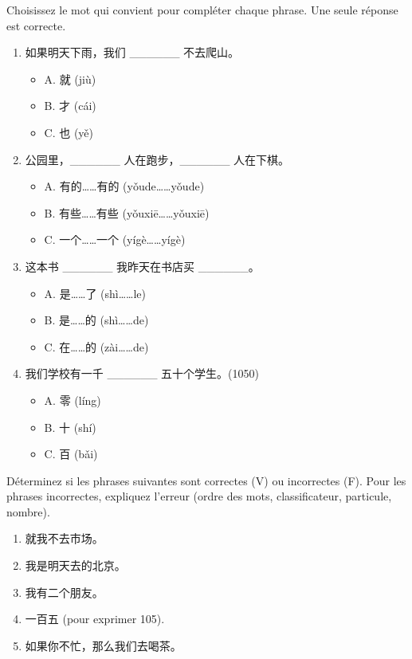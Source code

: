 \documentclass[11pt]{article}
\begin{document}
\begin{exercice}
Choisissez le mot qui convient pour compléter chaque phrase. Une seule réponse est correcte.
\begin{enumerate}
    \item 如果明天下雨，我们 \_\_\_\_\_\_ 不去爬山。
    \begin{itemize}
        \item A. 就 (jiù)
        \item B. 才 (cái)
        \item C. 也 (yě)
    \end{itemize}
    \item 公园里，\_\_\_\_\_\_ 人在跑步，\_\_\_\_\_\_ 人在下棋。
    \begin{itemize}
        \item A. 有的……有的 (yǒude……yǒude)
        \item B. 有些……有些 (yǒuxiē……yǒuxiē)
        \item C. 一个……一个 (yígè……yígè)
    \end{itemize}
    \item 这本书 \_\_\_\_\_\_ 我昨天在书店买 \_\_\_\_\_\_。
    \begin{itemize}
        \item A. 是……了 (shì……le)
        \item B. 是……的 (shì……de)
        \item C. 在……的 (zài……de)
    \end{itemize}
    \item 我们学校有一千 \_\_\_\_\_\_ 五十个学生。(1050)
    \begin{itemize}
        \item A. 零 (líng)
        \item B. 十 (shí)
        \item C. 百 (bǎi)
    \end{itemize}
\end{enumerate}
\end{exercice}

\begin{exercice}
Déterminez si les phrases suivantes sont correctes (V) ou incorrectes (F). Pour les phrases incorrectes, expliquez l'erreur (ordre des mots, classificateur, particule, nombre).
\begin{enumerate}
    \item 就我不去市场。
    \item 我是明天去的北京。
    \item 我有二个朋友。
    \item 一百五 (pour exprimer 105).
    \item 如果你不忙，那么我们去喝茶。
\end{enumerate}
\end{exercice}
\end{document}
